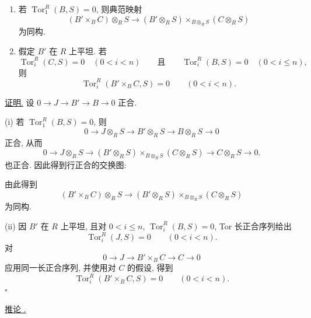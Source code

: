 \begin{enumerate}[label=(\roman*)]
\item 若 $\operatorname{Tor}_1^R(B,S)=0$, 则典范映射
\[
 (B'\times_BC)\otimes_RS
 \longrightarrow
 (B'\otimes_RS)\times_{B\otimes_RS}(C\otimes_RS)
\]
为同构.

\item 假定 $B'$ 在 $R$ 上平坦. 若
\[
 \operatorname{Tor}_i^R(C,S)=0\quad(0<i<n)
 \qquad\text{且}\qquad
 \operatorname{Tor}_i^R(B,S)=0\quad(0<i\leq n),
\]
则
\[
 \operatorname{Tor}_i^R(B'\times_BC,S)=0\qquad(0<i<n).
\]
\end{enumerate}

\underline{证明.} 设 $0\longrightarrow J\longrightarrow B'\longrightarrow B\longrightarrow0$ 正合.

(i) 若 $\operatorname{Tor}_1^R(B,S)=0$, 则
\[
 0\longrightarrow J\otimes_RS\longrightarrow B'\otimes_RS
 \longrightarrow B\otimes_RS\longrightarrow0
\]
正合, 从而
\[
 0\longrightarrow J\otimes_RS
 \longrightarrow
 (B'\otimes_RS)\times_{B\otimes_RS}(C\otimes_RS)
 \longrightarrow C\otimes_RS\longrightarrow0.
\]
也正合. 因此得到行正合的交换图:
\begin{center}
\scriptsize
{}
\end{center}


由此得到
\[
 (B'\times_BC)\otimes_RS
 \longrightarrow
 (B'\otimes_RS)\times_{B\otimes_RS}(C\otimes_RS)
\]
为同构.

(ii) 因 $B'$ 在 $R$ 上平坦, 且对 $0<i\leq n$,
$\operatorname{Tor}_i^R(B,S)=0$, Tor 长正合序列给出
\[
 \operatorname{Tor}_i^R(J,S)=0\qquad(0<i<n).
\]
对
\[
 0\longrightarrow J\longrightarrow B'\times_BC
 \longrightarrow C\longrightarrow0
\]
应用同一长正合序列, 并使用对 $C$ 的假设, 得到
\[
 \operatorname{Tor}_i^R(B'\times_BC,S)=0\qquad(0<i<n).
\]
\hfill$\square$

\underline{推论 .}

